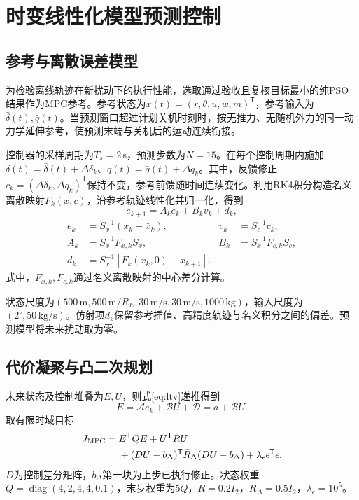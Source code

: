\section{时变线性化模型预测控制}
\subsection{参考与离散误差模型}
为检验离线轨迹在新扰动下的执行性能，选取通过验收且复核目标最小的纯PSO结果作为MPC参考。参考状态为$\bar x(t)=(r,\theta,u,w,m)^{\mathsf T}$，参考输入为$\bar\delta(t),\bar q(t)$。当预测窗口超过计划关机时刻时，按无推力、无随机外力的同一动力学延伸参考，使预测末端与关机后的运动连续衔接。

控制器的采样周期为$T_s=2$\,s，预测步数为$N=15$。在每个控制周期内施加$\delta(t)=\bar\delta(t)+\Delta\delta_k$、$q(t)=\bar q(t)+\Delta q_k$。其中，反馈修正$c_k=(\Delta\delta_k,\Delta q_k)^{\mathsf T}$保持不变，参考前馈随时间连续变化。利用RK4积分构造名义离散映射$F_k(x,c)$，沿参考轨迹线性化并归一化，得到
\begin{equation}e_{k+1}=A_ke_k+B_kv_k+d_k,\label{eq:ltv}\end{equation}
\begin{equation}
\begin{aligned}
e_k&=S_x^{-1}(x_k-\bar x_k),&v_k&=S_c^{-1}c_k,\\
A_k&=S_x^{-1}F_{x,k}S_x,&B_k&=S_x^{-1}F_{c,k}S_c,\\
d_k&=S_x^{-1}[F_k(\bar x_k,0)-\bar x_{k+1}].
\end{aligned}
\end{equation}
式中，$F_{x,k},F_{c,k}$通过名义离散映射的中心差分计算。

状态尺度为$(500\,\mathrm m,500\,\mathrm m/R_E,30\,\mathrm{m/s},30\,\mathrm{m/s},1000\,\mathrm{kg})$，输入尺度为$(2^\circ,50\,\mathrm{kg/s})$。仿射项$d_k$保留参考插值、高精度轨迹与名义积分之间的偏差。预测模型将未来扰动取为零。

\subsection{代价凝聚与凸二次规划}
未来状态及控制堆叠为$E,U$，则式\eqref{eq:ltv}递推得到
\begin{equation}E=\mathcal A e_k+\mathcal B U+\mathcal D=a+\mathcal B U.\end{equation}
取有限时域目标
\begin{equation}
\begin{aligned}
J_{\rm MPC}={}&E^{\mathsf T}\bar Q E+U^{\mathsf T}\bar R U\\
&+(DU-b_\Delta)^{\mathsf T}\bar R_\Delta(DU-b_\Delta)
+\lambda_\epsilon\epsilon^{\mathsf T}\epsilon .
\end{aligned}
\end{equation}
$D$为控制差分矩阵，$b_\Delta$第一块为上步已执行修正。状态权重$Q=\operatorname{diag}(4,2,4,4,0.1)$，末步权重为$5Q$，$R=0.2I_2$，$R_\Delta=0.5I_2$，$\lambda_\epsilon=10^5$。

